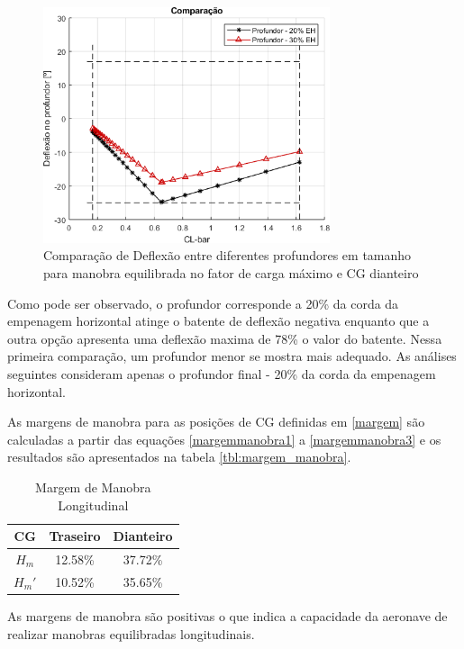 \begin{figure}[H]
\centering
\includegraphics[width=0.75\textwidth]{images/parte3/comparacao_deflexao.png}
\caption[Comparação de Deflexão entre diferentes profundores em tamanho para manobra equilibrada]{Comparação de Deflexão entre diferentes profundores em tamanho para manobra equilibrada no fator de carga máximo e CG dianteiro}
\label{fig:comp_def}
\end{figure}

Como pode ser observado, o profundor corresponde a 20\% da corda da empenagem horizontal atinge o batente de deflexão negativa enquanto que a outra opção apresenta uma deflexão maxima de 78\% o valor do batente. Nessa primeira comparação, um profundor menor se mostra mais adequado. As análises seguintes consideram apenas o profundor final - 20\% da corda da empenagem horizontal.

As margens de manobra para as posições de CG definidas em \autoref{margem} são calculadas a partir das equações \ref{margemmanobra1} a \ref{margemmanobra3} e os resultados são apresentados na tabela \autoref{tbl:margem_manobra}.

\begin{table}[H]
\centering
\begin{tabular}{ccc}
\toprule
CG & Traseiro & Dianteiro \\ \midrule
$ H_m $ & 12.58\% & 37.72\% \\
$ H_m' $ & 10.52\% & 35.65\% \\
\bottomrule
\end{tabular}
\caption[Margem de Manobra Longitudinal]{Margem de Manobra Longitudinal}
\label{tbl:margem_manobra}
\end{table}

As margens de manobra são positivas o que indica a capacidade da aeronave de realizar manobras equilibradas longitudinais.

